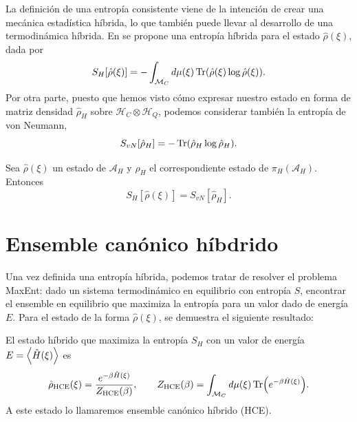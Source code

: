 \documentclass[openany, 11pt]{book}
\numberwithin{equation}{chapter}
\newcommand{\Hc}{\mathcal H_C}
\newcommand{\Hq}{\mathcal H_Q}
\newcommand{\Ah}{\mathcal A_H}
\newcommand{\Mc}{\mathcal M_C}
\begin{document}
La definición de una entropía consistente viene de la intención de crear una mecánica estadística híbrida, lo que también puede llevar al desarrollo de una termodinámica híbrida. 
En \cite{alonso} se propone una entropía híbrida para el estado $\hat\rho(\xi)$, dada por \begin{equation}
    S_H[\hat\rho(\xi)] =-\int_{\Mc}d\mu(\xi)\Tr (\hat \rho(\xi)\log\hat\rho(\xi)).
\end{equation}Por otra parte, puesto que hemos visto cómo expresar nuestro estado en forma de matriz densidad $\hat\rho_H$ sobre $\Hc\otimes\Hq$, podemos considerar también la entropía de von Neumann,\begin{equation}
    S_{vN}[\hat\rho_H] = -\Tr(\hat\rho_H\log\hat\rho_H).
\end{equation}\begin{proposition}
    Sea $\hat\rho(\xi)$ un estado de $\Ah$ y $\hat\rho_H$ el correspondiente estado de $\pi_H(\Ah)$. Entonces \begin{equation}S_H[\hat\rho(\xi)]=S_{vN}[\hat\rho_H].\end{equation} 
\end{proposition}

\section{Ensemble canónico híbdrido}

Una vez definida una entropía híbrida, podemos tratar de resolver el problema MaxEnt: dado un sistema termodinámico en equilibrio con entropía $S$, encontrar el ensemble en equilibrio 
que maximiza la entropía para un valor dado de energía $E$. Para el estado de la forma $\hat\rho(\xi)$, se demuestra el siguiente resultado: \begin{proposition}[HCE]
    El estado híbrido que maximiza la entropía $S_H$ con un valor de energía $E=\expval{\hat H(\xi)}$ es \begin{equation}
        \hat\rho_\text{HCE}(\xi) = \dfrac{e^{-\beta\hat H(\xi)}}{Z_\text{HCE}(\beta)}, \qquad Z_\text{HCE}(\beta) = \int_{\Mc} d\mu (\xi) \Tr(e^{-\beta \hat H(\xi)}).
    \end{equation}A este estado lo llamaremos ensemble canónico híbrido (HCE).
\end{proposition}
\end{document}

